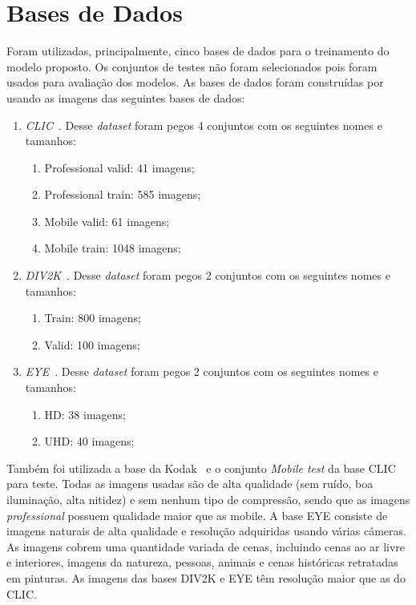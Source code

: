 \section{Bases de Dados}%
Foram utilizadas, principalmente, cinco bases de dados para o treinamento do modelo proposto. Os conjuntos de testes não foram selecionados pois foram usados para avaliação dos modelos. As bases de dados foram construídas por~\cite{eduardo}  usando as imagens das seguintes bases de dados:
\begin{enumerate}
    \item \emph{\acrshort{CLIC}}~\cite{clic}. Desse \textit{dataset} foram pegos 4 conjuntos com os seguintes nomes e tamanhos:
    \begin{enumerate}
        \item Professional valid: 41 imagens;
        \item Professional train: 585 imagens;
        \item Mobile valid: 61 imagens;
        \item Mobile train: 1048 imagens;
    \end{enumerate}
    \item \emph{\acrshort{DIV2K}}~\cite{div2k}. Desse \textit{dataset} foram pegos 2 conjuntos com os seguintes nomes e tamanhos:
    \begin{enumerate}
        \item Train: 800 imagens;
        \item Valid: 100 imagens;
    \end{enumerate}
    \item \emph{\acrshort{EYE}}~\cite{ultra_eye}. Desse \textit{dataset} foram pegos 2 conjuntos com os seguintes nomes e tamanhos:
    \begin{enumerate}
        \item HD: 38 imagens;
        \item UHD: 40 imagens;
    \end{enumerate}
\end{enumerate}
Também foi utilizada a base da Kodak~\cite{kodak} e o conjunto \textit{Mobile test} da base \acrshort{CLIC} para teste. Todas as imagens usadas são de alta qualidade (sem ruído, boa iluminação, alta nitidez) e sem nenhum tipo de compressão, sendo que as imagens \textit{professional} possuem qualidade maior que as {mobile}. A base \acrshort{EYE} consiste de imagens naturais de alta qualidade e resolução adquiridas usando várias câmeras. As imagens cobrem uma quantidade variada de cenas, incluindo cenas ao ar livre e interiores, imagens da natureza, pessoas, animais e cenas históricas retratadas em pinturas. As imagens das bases \acrshort{DIV2K} e \acrshort{EYE} têm resolução maior que as do \acrshort{CLIC}.

